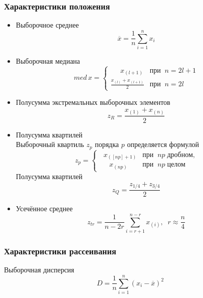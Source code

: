 \documentclass[a4paper]{article}
\begin{document}
\subsubsection{Характеристики положения}
\begin{itemize}
    \item Выборочное среднее
    \begin{equation}\label{mean}
        \overline{x}=\frac{1}{n}\sum_{i=1}^n x_i
    \end{equation}
    \item Выборочная медиана
    \begin{equation}\label{med}
        med\,x = \begin{cases}
        \displaystyle\;\;\;\;\;x_{(l+1)}&\text{при}\;\;n=2l+1\\
        \displaystyle\frac{x_{(l)}+x_{(l+1)}}{2}&\text{при}\;\;n=2l
        \end{cases}
    \end{equation}
    \item Полусумма экстремальных выборочных элементов
    \begin{equation}\label{exhfsum}
        z_R=\frac{x_{(1)}+x_{(n)}}{2}
    \end{equation}
    \item Полусумма квартилей\\
    Выборочный квартиль $z_p$ порядка $p$ определяется формулой
    \begin{equation}
        z_p = \begin{cases}\label{pqv}
        \displaystyle\;\;x_{([np]+1)}&\text{при}\;\;np\;\text{дробном,}\\
        \displaystyle\;\;\;\;\;x_{(np)}&\text{при}\;\;np\;\text{целом}
        \end{cases}
    \end{equation}
    Полусумма квартилей
    \begin{equation}\label{eq:hfsum}
        z_Q=\frac{z_{1/4}+z_{3/4}}{2}
    \end{equation}
    \item Усечённое среднее
    \begin{equation}\label{eq:trmean}
        z_{tr}=\frac{1}{n-2r}\sum_{i=r+1}^{n-r}x_{(i)},\;\;r\approx\frac{n}{4}
    \end{equation}
\end{itemize}
    \subsubsection{Характеристики рассеивания}
Выборочная дисперсия
\begin{equation}\label{eq:svar}
    D=\frac{1}{n}\sum_{i=1}^n \left(x_i-\overline{x}\right)^2
\end{equation}
\end{document}

